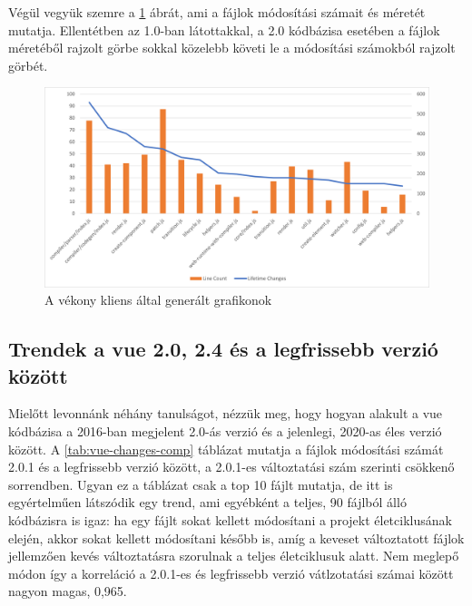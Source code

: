 Végül vegyük szemre a \ref{fig:vue2-lines-changes} ábrát, ami a fájlok módosítási számait és méretét mutatja. Ellentétben az 1.0-ban látottakkal, a 2.0 kódbázisa esetében a fájlok méretéből rajzolt görbe sokkal közelebb követi le a módosítási számokból rajzolt görbét.

\begin{figure}[H]
    \centering
    \includegraphics[width=1\textwidth]{images/vue/vue2-lines-lifetimechanges.png}
    \caption{A vékony kliens által generált grafikonok}
    \label{fig:vue2-lines-changes}
\end{figure}

\subsection{Trendek a vue 2.0, 2.4 és a legfrissebb verzió között}

Mielőtt levonnánk néhány tanulságot, nézzük meg, hogy hogyan alakult a vue kódbázisa a 2016-ban megjelent 2.0-ás verzió és a jelenlegi, 2020-as éles verzió között. A \ref{tab:vue-changes-comp} táblázat mutatja a fájlok módosítási számát 2.0.1 és a legfrissebb verzió között, a 2.0.1-es változtatási szám szerinti csökkenő sorrendben. Ugyan ez a táblázat csak a top 10 fájlt mutatja, de itt is egyértelműen látszódik egy trend, ami egyébként a teljes, 90 fájlból álló kódbázisra is igaz: ha egy fájlt sokat kellett módosítani a projekt életciklusának elején, akkor sokat kellett módosítani később is, amíg a keveset változtatott fájlok jellemzően kevés változtatásra szorulnak a teljes életciklusuk alatt. Nem meglepő módon így a korreláció a 2.0.1-es és legfrissebb verzió vátlzotatási számai között nagyon magas, 0,965.

